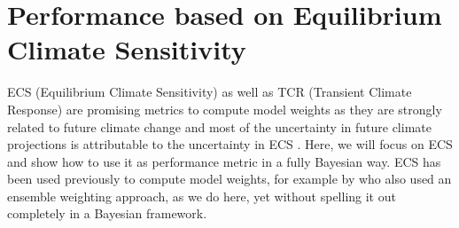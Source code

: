 \section{Performance based on Equilibrium Climate Sensitivity}\label{sec:ecs}

ECS (Equilibrium Climate Sensitivity) as well as TCR (Transient Climate Response) are promising metrics to compute model weights as they are strongly related to future climate change and most of the uncertainty in future climate projections is attributable to the uncertainty in ECS \citep{sherwoodAssessmentEarthsClimate2020,armourEarthsEnergyBudget2021}.
Here, we will focus on ECS and show how to use it as performance metric in a fully Bayesian way. 
ECS has been used previously to compute model weights, for example by \citet{massoudBayesianWeightingClimate2023} who also used an ensemble weighting approach, as we do here, yet without spelling it out completely in a Bayesian framework.

